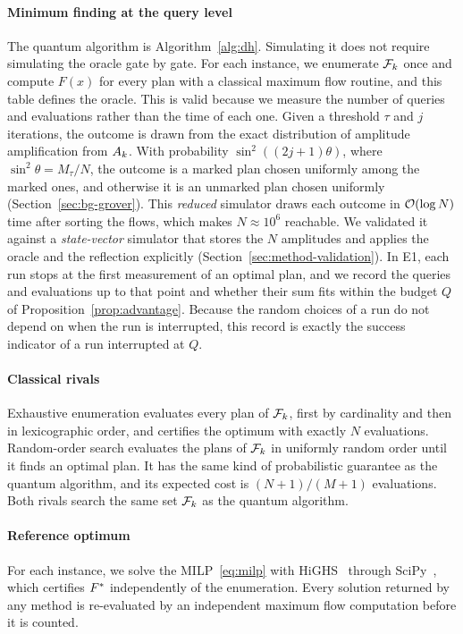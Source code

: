 \paragraph{Minimum finding at the query level} The quantum algorithm is Algorithm~\ref{alg:dh}. Simulating it does not require simulating the oracle gate by gate. For each instance, we enumerate $\mathcal{F}_k$ once and compute $F(x)$ for every plan with a classical maximum flow routine, and this table defines the oracle. This is valid because we measure the number of queries and evaluations rather than the time of each one. Given a threshold $\tau$ and $j$ iterations, the outcome is drawn from the exact distribution of amplitude amplification from $A_k$. With probability $\sin^2((2j+1)\theta)$, where $\sin^2\theta=M_\tau/N$, the outcome is a marked plan chosen uniformly among the marked ones, and otherwise it is an unmarked plan chosen uniformly (Section~\ref{sec:bg-grover}). This \emph{reduced} simulator draws each outcome in $\mathcal{O}(\log N)$ time after sorting the flows, which makes $N\approx 10^6$ reachable. We validated it against a \emph{state-vector} simulator that stores the $N$ amplitudes and applies the oracle and the reflection explicitly (Section~\ref{sec:method-validation}). In E1, each run stops at the first measurement of an optimal plan, and we record the queries and evaluations up to that point and whether their sum fits within the budget $Q$ of Proposition~\ref{prop:advantage}. Because the random choices of a run do not depend on when the run is interrupted, this record is exactly the success indicator of a run interrupted at $Q$.

\paragraph{Classical rivals} Exhaustive enumeration evaluates every plan of $\mathcal{F}_k$, first by cardinality and then in lexicographic order, and certifies the optimum with exactly $N$ evaluations. Random-order search evaluates the plans of $\mathcal{F}_k$ in uniformly random order until it finds an optimal plan. It has the same kind of probabilistic guarantee as the quantum algorithm, and its expected cost is $(N+1)/(M+1)$ evaluations. Both rivals search the same set $\mathcal{F}_k$ as the quantum algorithm.

\paragraph{Reference optimum} For each instance, we solve the MILP~\eqref{eq:milp} with HiGHS~\cite{highs2018} through SciPy~\cite{scipy2020}, which certifies $F^{*}$ independently of the enumeration. Every solution returned by any method is re-evaluated by an independent maximum flow computation before it is counted.

